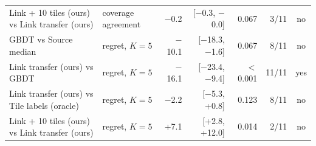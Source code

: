 \begin{tabular}{llrrrrc}
Link + 10 tiles (ours) vs Link transfer (ours) & coverage agreement & \ensuremath{-}0.2 & [\ensuremath{-}0.3, \ensuremath{-}0.0] & 0.067 & 3/11 & no \\
GBDT vs Source median & regret, $K{=}5$ & \ensuremath{-}10.1 & [\ensuremath{-}18.3, \ensuremath{-}1.6] & 0.067 & 8/11 & no \\
Link transfer (ours) vs GBDT & regret, $K{=}5$ & \ensuremath{-}16.1 & [\ensuremath{-}23.4, \ensuremath{-}9.4] & $<$0.001 & 11/11 & yes \\
Link transfer (ours) vs Tile labels (oracle) & regret, $K{=}5$ & \ensuremath{-}2.2 & [\ensuremath{-}5.3, +0.8] & 0.123 & 8/11 & no \\
Link + 10 tiles (ours) vs Link transfer (ours) & regret, $K{=}5$ & +7.1 & [+2.8, +12.0] & 0.014 & 2/11 & no \\
\bottomrule
\end{tabular}
